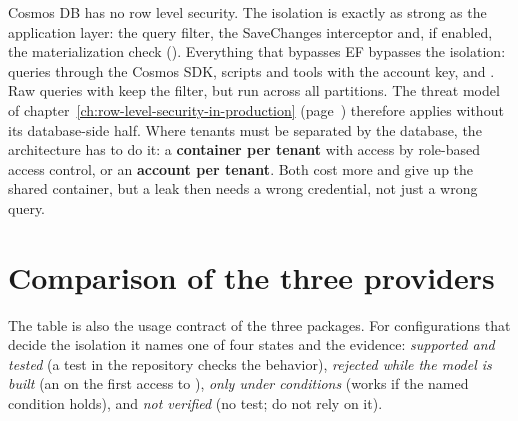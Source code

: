 \begin{important}
  Cosmos DB has no row level security. The isolation is exactly as strong as the application
  layer: the query filter, the SaveChanges interceptor and, if enabled, the materialization
  check (). Everything that
  bypasses EF bypasses the isolation: queries through the Cosmos SDK, scripts and tools with
  the account key, and . Raw queries with
   keep the filter, but run across all partitions. The threat model
  of chapter~\ref{ch:row-level-security-in-production} (page~\pageref{sec:threat-model})
  therefore applies without its database-side half. Where tenants must be separated by the
  database, the architecture has to do it: a \textbf{container per tenant} with access by
  role-based access control, or an \textbf{account per tenant}. Both cost more and give up the
  shared container, but a leak then needs a wrong credential, not just a wrong query.
\end{important}

\section{Comparison of the three providers}\label{sec:provider-comparison}

The table is also the usage contract of the three packages. For configurations that decide the
isolation it names one of four states and the evidence: \emph{supported and tested} (a test
in the repository checks the behavior), \emph{rejected while the model is built} (an
 on the first access to
), \emph{only under conditions} (works if the named condition holds), and
\emph{not verified} (no test; do not rely on it).

